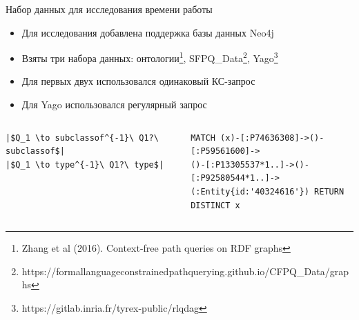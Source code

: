 \documentclass[aspectratio=169]{beamer}
\begin{document}
\begin{frame}[fragile]{Набор данных для исследования времени работы}
  \begin{itemize}
    \item Для исследования добавлена поддержка базы данных Neo4j
    \item Взяты три набора данных: онтологии\footnote[1]{Zhang et al (2016). Context-free path queries on RDF graphs}, SFPQ\_Data\footnote[2]{https://formallanguageconstrainedpathquerying.github.io/CFPQ\_Data/graphs}, Yago\footnote[3]{https://gitlab.inria.fr/tyrex-public/rlqdag}
    \item Для первых двух использовался одинаковый КС-запрос
    \item Для Yago использовался регулярный запрос
  \end{itemize}
  \begin{columns}[t]
    \begin{column}{0.46\textwidth}

      \begin{verbatim}
|$Q_1 \to subclassof^{-1}\ Q1?\ subclassof$|
|$Q_1 \to type^{-1}\ Q1?\ type$|
\end{verbatim}
    \end{column}

    \begin{column}{0.6\textwidth}
      \begin{verbatim}
MATCH (x)-[:P74636308]->()-[:P59561600]->
()-[:P13305537*1..]->()-[:P92580544*1..]->
(:Entity{id:'40324616'}) RETURN DISTINCT x
\end{verbatim}
    \end{column}
  \end{columns}

\end{frame}
\end{document}
